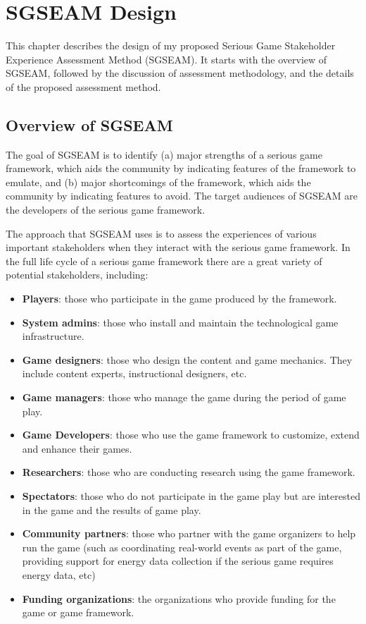 \chapter{SGSEAM Design}
\label{cha:framework-description}
This chapter describes the design of my proposed Serious Game Stakeholder Experience 
Assessment Method (SGSEAM). It starts with the overview of SGSEAM, followed by the discussion of assessment methodology, and the details of the proposed assessment method.

\section{Overview of SGSEAM}

The goal of SGSEAM is to identify (a) major strengths of a serious game
framework, which aids the community by indicating features of the framework to emulate, and
(b) major shortcomings of the framework, which aids the community by indicating features to avoid.
The target audiences of SGSEAM are the developers of the serious game framework.

The approach that SGSEAM uses is to assess the experiences of various important stakeholders when
they interact with the serious game framework. In the full life cycle of a serious game framework
there are a great variety of potential stakeholders, including:

\begin{itemize}
\item \textbf{Players}: those who participate in the game produced by the framework.
\item \textbf{System admins}: those who install and maintain the technological game infrastructure.
\item \textbf{Game designers}: those who design the content and game mechanics. They include  content experts, instructional designers, etc.
\item \textbf{Game managers}: those who manage the game during the period of game play.
\item \textbf{Game Developers}: those who use the game framework to customize, extend and enhance their games.
\item \textbf{Researchers}: those who are conducting research using the game framework.
\item \textbf{Spectators}: those who do not participate in the game play but are interested in the game and the results of game play. 
\item \textbf{Community partners}: those who partner with the game organizers to help run the game (such as coordinating real-world events as part of the game, providing support for energy data
  collection if the serious game requires energy data, etc) 
\item \textbf{Funding organizations}: the organizations who provide funding for the game or game framework.
\end{itemize}


